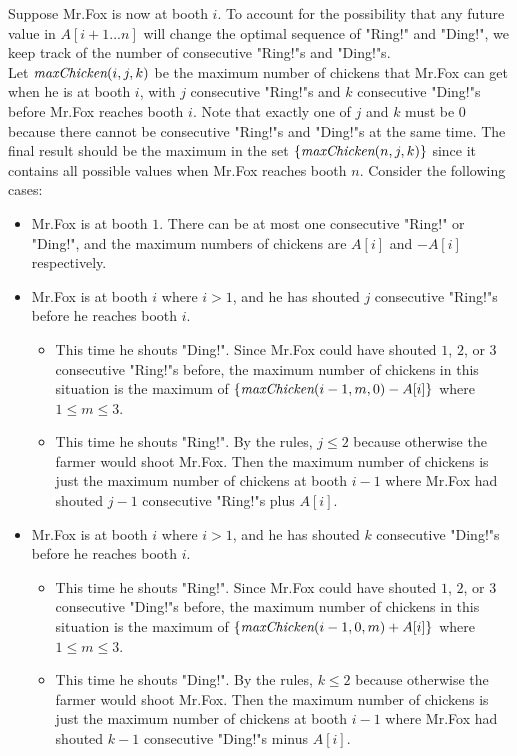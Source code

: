 \documentclass[11pt]{article}
\begin{document}
\begin{solution}
Suppose Mr.Fox is now at booth $i$. To account for the possibility that any future value in $A[i+1...n]$ will change the optimal sequence of "Ring!" and "Ding!", we keep track of the number of consecutive "Ring!"s and "Ding!"s.\\
Let $\emph{maxChicken}(i,j,k)$ be the maximum number of chickens that Mr.Fox can get when he is at booth $i$, with $j$ consecutive "Ring!"s and $k$ consecutive "Ding!"s before Mr.Fox reaches booth $i$. Note that exactly one of $j$ and $k$ must be $0$ because there cannot be consecutive "Ring!"s and "Ding!"s at the same time. The final result should be the maximum in the set $\{\emph{maxChicken}(n, j, k)\}$ since it contains all possible values when Mr.Fox reaches booth $n$. Consider the following cases:
\begin{itemize}
\item Mr.Fox is at booth $1$. There can be at most one consecutive "Ring!" or "Ding!", and the maximum numbers of chickens are $A[i]$ and $-A[i]$ respectively.
\item Mr.Fox is at booth $i$ where $i>1$, and he has shouted $j$ consecutive "Ring!"s before he reaches booth $i$.
\begin{itemize}
\item This time he shouts "Ding!". Since Mr.Fox could have shouted $1$, $2$, or $3$ consecutive "Ring!"s before, the maximum number of chickens in this situation is the maximum of $\{\emph{maxChicken}(i-1,m,0)-A[i]\}$ where $1\le m \le 3$.
\item This time he shouts "Ring!". By the rules, $j\le 2$ because otherwise the farmer would shoot Mr.Fox. Then the maximum number of chickens is just the maximum number of chickens at booth $i-1$ where Mr.Fox had shouted $j-1$ consecutive "Ring!"s plus $A[i]$.
\end{itemize}
\item Mr.Fox is at booth $i$ where $i>1$, and he has shouted $k$ consecutive "Ding!"s before he reaches booth $i$.
\begin{itemize}
\item This time he shouts "Ring!". Since Mr.Fox could have shouted $1$, $2$, or $3$ consecutive "Ding!"s before, the maximum number of chickens in this situation is the maximum of $\{\emph{maxChicken}(i-1,0,m)+A[i]\}$ where $1\le m \le 3$.
\item This time he shouts "Ding!". By the rules, $k\le 2$ because otherwise the farmer would shoot Mr.Fox. Then the maximum number of chickens is just the maximum number of chickens at booth $i-1$ where Mr.Fox had shouted $k-1$ consecutive "Ding!"s minus $A[i]$.

\end{itemize}
\end{itemize}
\end{solution}
\end{document}
